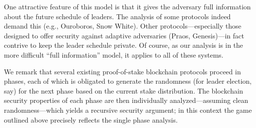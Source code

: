   One attractive feature of this
  model is that it gives the adversary full information about the future
  schedule of leaders. The analysis of some protocols indeed demand this
  (e.g., Ouroboros, Snow White). Other protocols---especially those
  designed to offer security against adaptive adversaries (Praos,
  Genesis)---in fact contrive to keep the leader schedule private. Of
  course, as our analysis is in the more difficult ``full information''
  model, it applies to all of these systems.

   We remark that
  several existing proof-of-stake blockchain protocols proceed in
  phases, each of which is obligated to generate the randomness (for
  leader election, say) for the next phase based on the current stake
  distribution. The blockchain security properties of each phase are
  then individually analyzed---assuming clean randomness---which yields
  a recursive security argument; in this context the game outlined above
  precisely reflects the single phase analysis.






